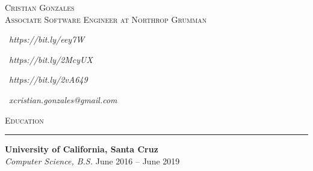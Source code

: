 \documentclass{res}
\begin{document}
\begin{resume}

\begin{center}
\textsc{{\Huge Cristian Gonzales}}\\
\vspace{1mm}
\textsc{\large Associate Software Engineer at Northrop Grumman}\\
\vspace{1mm}
\end{center}

\begin{multicols}{4}
\begin{center}
\faLinkedinSquare\ 
\textit{https://bit.ly/eey7W}
\end{center}
\columnbreak
\begin{center}
\faGithub\ 
\textit{https://bit.ly/2McyUX}
\end{center}
\columnbreak
\begin{center}
\faGlobe\ 
\textit{https://bit.ly/2vA649}
\end{center}
\columnbreak
\faEnvelope\ 
\textit{xcristian.gonzales@gmail.com}
\end{multicols}

\vspace{-3mm}

\textsc{{\Large Education}}
\vspace{0.5mm}
\hrule width18.5cm
\textbf{University of California, Santa Cruz}\\
\textit{Computer Science, B.S.}
\hfill
June 2016 -- June 2019\\
\vspace{-4mm}


\end{resume}
\end{document}
